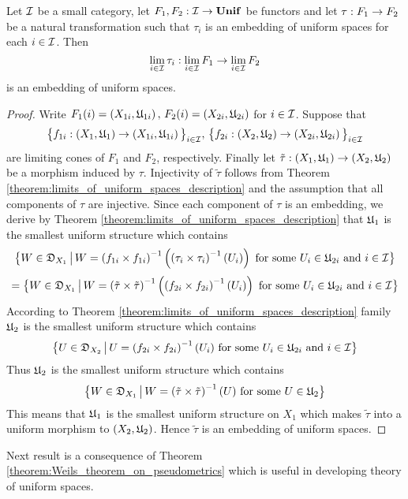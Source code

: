 \begin{proposition}\label{proposition:embeddings_are_closed_under_small_limits}
Let ${\mathcal I}$ be a small category, let $F_1,F_2:{\mathcal I}\rightarrow \mathbf{Unif}$ be functors and let $\tau:F_1\rightarrow F_2$ be a natural transformation such that $\tau_i$ is an embedding of uniform spaces for each $i \in {\mathcal I}$. Then
$$\lim_{i\in {\mathcal I}}\tau_i:\lim_{i\in {\mathcal I}}F_1\rightarrow \lim_{i\in {\mathcal I}}F_2$$
is an embedding of uniform spaces.
\end{proposition}
\begin{proof}
Write $F_1(i) = \left(X_{1i},{\mathfrak U}_{1i}\right),\,F_2(i) = \left(X_{2i},{\mathfrak U}_{2i}\right)$ for $i\in {\mathcal I}$. Suppose that 
$$\big\{f_{1i}:\left(X_1,{\mathfrak U}_1\right) \rightarrow \left(X_{1i},{\mathfrak U}_{1i}\right)\big\}_{i\in {\mathcal I}},\,\big\{f_{2i}:\left(X_2,{\mathfrak U}_2\right) \rightarrow \left(X_{2i},{\mathfrak U}_{2i}\right)\big\}_{i\in {\mathcal I}}$$
are limiting cones of $F_1$ and $F_2$, respectively. Finally let $\tilde{\tau}:\left(X_1,{\mathfrak U}_1\right)\rightarrow \left(X_2,{\mathfrak U}_2\right)$ be a morphism induced by $\tau$. Injectivity of $\tilde{\tau}$ follows from Theorem \ref{theorem:limits_of_uniform_spaces_description} and the assumption that all components of $\tau$ are injective. Since each component of $\tau$ is an embedding, we derive by Theorem \ref{theorem:limits_of_uniform_spaces_description} that ${\mathfrak U}_{1}$ is the smallest uniform structure which contains
$$\big\{W \in {\mathfrak D}_{X_1}\,\big|\,W = \left(f_{1i}\times f_{1i}\right)^{-1}\left(\left(\tau_{i}\times \tau_{i}\right)^{-1}(U_i)\right)\mbox{ for some }U_i\in {\mathfrak U}_{2i}\mbox{ and }i\in {\mathcal I}\big\}$$
$$= \big\{W \in {\mathfrak D}_{X_1}\,\big|\,W = \left(\tilde{\tau}\times \tilde{\tau}\right)^{-1}\left(\left(f_{2i}\times f_{2i}\right)^{-1}(U_i)\right)\mbox{ for some }U_i\in {\mathfrak U}_{2i}\mbox{ and }i\in {\mathcal I}\big\}$$
According to Theorem \ref{theorem:limits_of_uniform_spaces_description} family ${\mathfrak U}_{2}$ is the smallest uniform structure which contains 
$$\big\{U\in {\mathfrak D}_{X_2}\,\big|\,U=\left(f_{2i}\times f_{2i}\right)^{-1}(U_i)\mbox{ for some }U_i\in {\mathfrak U}_{2i}\mbox{ and }i\in {\mathcal I}\big\}$$
Thus ${\mathfrak U}_{2}$ is the smallest uniform structure which contains
$$\big\{W \in {\mathfrak D}_{X_1}\,\big|\,W = \left(\tilde{\tau}\times \tilde{\tau}\right)^{-1}(U)\mbox{ for some }U\in {\mathfrak U}_{2}\big\}$$
This means that ${\mathfrak U}_1$ is the smallest uniform structure on $X_1$ which makes $\tilde{\tau}$ into a uniform morphism to $\left(X_2,{\mathfrak U}_2\right)$. Hence $\tilde{\tau}$ is an embedding of uniform spaces.
\end{proof}
\noindent
Next result is a consequence of Theorem \ref{theorem:Weils_theorem_on_pseudometrics} which is useful in developing theory of uniform spaces.

